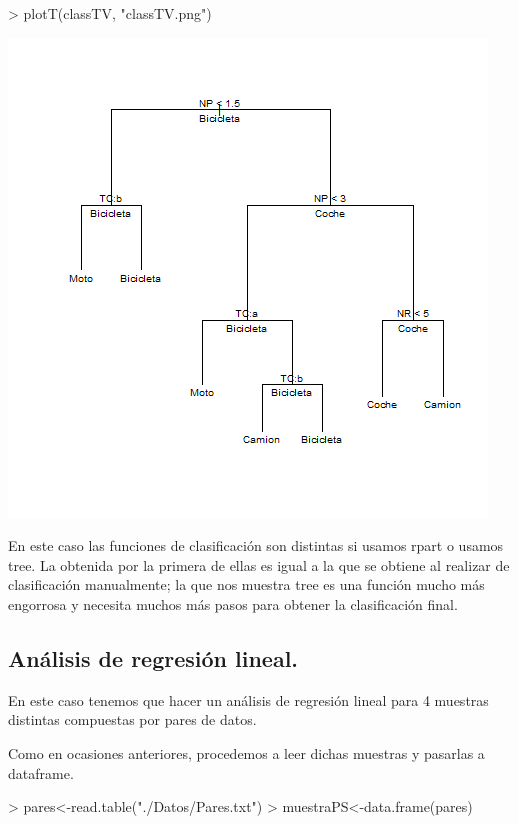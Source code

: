 \documentclass [a4paper] {article}
\begin{document}
\begin{Schunk}
\begin{Sinput}
> plotT(classTV, "classTV.png")
\end{Sinput}
\end{Schunk}
\includegraphics[width=\textwidth]{classTV}

\bigskip
En este caso las funciones de clasificación son distintas si usamos rpart o usamos tree. La obtenida por la primera de ellas es igual
a la que se obtiene al realizar de clasificación manualmente; la que nos muestra tree es una función mucho más engorrosa y necesita
muchos más pasos para obtener la clasificación final.

\subsection{Análisis de regresión lineal.}
En este caso tenemos que hacer un análisis de regresión lineal para 4 muestras distintas compuestas
por pares de datos.

\bigskip
Como en ocasiones anteriores, procedemos a leer dichas muestras y pasarlas a dataframe.
\begin{Schunk}
\begin{Sinput}
> pares<-read.table("./Datos/Pares.txt")
> muestraPS<-data.frame(pares)
\end{Sinput}
\end{Schunk}
\end{document}

